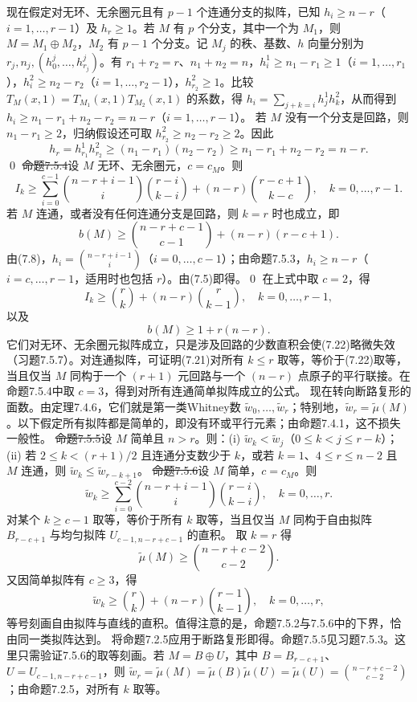 现在假定对无环、无余圈元且有 $p-1$ 个连通分支的拟阵，已知 $h_i\ge n-r$（$i=1,\ldots,r-1$）及 $h_r\ge1$。若 $M$ 有 $p$ 个分支，其中一个为 $M_1$，则 $M=M_1\oplus M_2$，$M_2$ 有 $p-1$ 个分支。记 $M_j$ 的秩、基数、$h$ 向量分别为 $r_j,n_j,(h_0^j,\ldots,h_{r_j}^j)$。有 $r_1+r_2=r$、$n_1+n_2=n$，$h_i^1\ge n_1-r_1\ge1$（$i=1,\ldots,r_1$），$h_i^2\ge n_2-r_2$（$i=1,\ldots,r_2-1$），$h_{r_2}^2\ge1$。比较 $T_M(x,1)=T_{M_1}(x,1)T_{M_2}(x,1)$ 的系数，得 $h_i=\sum_{j+k=i}h_j^1h_k^2$，从而得到 $h_i\ge n_1-r_1+n_2-r_2=n-r$（$i=1,\ldots,r-1$）。
若 $M$ 没有一个分支是回路，则 $n_1-r_1\ge2$，归纳假设还可取 $h_{r_2}^2\ge n_2-r_2\ge2$。因此
\[h_r=h_{r_1}^1h_{r_2}^2\ge(n_1-r_1)(n_2-r_2)\ge n_1-r_1+n_2-r_2=n-r.\]\qed
\st{命题7.5.4}设 $M$ 无环、无余圈元，$c=c_M$。则
\[I_k\ge\sum_{i=0}^{c-1}\binom{n-r+i-1}{i}\binom{r-i}{k-i}+(n-r)\binom{r-c+1}{k-c},\quad k=0,\ldots,r-1.\]
若 $M$ 连通，或者没有任何连通分支是回路，则 $k=r$ 时也成立，即
\[b(M)\ge\binom{n-r+c-1}{c-1}+(n-r)(r-c+1).\]
\pr 由(7.8)，$h_i=\binom{n-r+i-1}i$（$i=0,\ldots,c-1$）；由命题7.5.3，$h_i\ge n-r$（$i=c,\ldots,r-1$，适用时也包括 $r$）。由(7.5)即得。\qed
在上式中取 $c=2$，得
\[I_k\ge\binom rk+(n-r)\binom r{k-1},\quad k=0,\ldots,r-1,\tag{7.21}\]
以及
\[b(M)\ge1+r(n-r).\tag{7.22}\]
它们对无环、无余圈元拟阵成立，只是涉及回路的少数直积会使(7.22)略微失效（习题7.5.7）。对连通拟阵，可证明(7.21)对所有 $k\le r$ 取等，等价于(7.22)取等，当且仅当 $M$ 同构于一个 $(r+1)$ 元回路与一个 $(n-r)$ 点原子的平行联接。在命题7.5.4中取 $c=3$，得到对所有连通简单拟阵成立的公式。
现在转向断路复形的面数。由定理7.4.6，它们就是第一类Whitney数 $\widetilde w_0,\ldots,\widetilde w_r$；特别地，$\widetilde w_r=\widetilde\mu(M)$。以下假定所有拟阵都是简单的，即没有环或平行元素；由命题7.4.1，这不损失一般性。
\st{命题7.5.5}设 $M$ 简单且 $n>r$。则：(i) $\widetilde w_k<\widetilde w_j$（$0\le k<j\le r-k$）；(ii) 若 $2\le k<(r+1)/2$ 且连通分支数少于 $k$，或若 $k=1$、$4\le r\le n-2$ 且 $M$ 连通，则 $\widetilde w_k\le\widetilde w_{r-k+1}$。
\st{命题7.5.6}设 $M$ 简单，$c=c_M$。则
\[\widetilde w_k\ge\sum_{i=0}^{c-2}\binom{n-r+i-1}{i}\binom{r-i}{k-i},\quad k=0,\ldots,r.\]
对某个 $k\ge c-1$ 取等，等价于所有 $k$ 取等，当且仅当 $M$ 同构于自由拟阵 $B_{r-c+1}$ 与均匀拟阵 $U_{c-1,n-r+c-1}$ 的直积。
取 $k=r$ 得
\[\widetilde\mu(M)\ge\binom{n-r+c-2}{c-2}.\tag{7.23}\]
又因简单拟阵有 $c\ge3$，得
\[\widetilde w_k\ge\binom rk+(n-r)\binom{r-1}{k-1},\quad k=0,\ldots,r,\tag{7.24}\]
等号刻画自由拟阵与直线的直积。值得注意的是，命题7.5.2与7.5.6中的下界，恰由同一类拟阵达到。
\pr 将命题7.2.5应用于断路复形即得。命题7.5.5见习题7.5.3。这里只需验证7.5.6的取等刻画。若 $M=B\oplus U$，其中 $B=B_{r-c+1}$、$U=U_{c-1,n-r+c-1}$，则 $\widetilde w_r=\widetilde\mu(M)=\widetilde\mu(B)\widetilde\mu(U)=\widetilde\mu(U)=\binom{n-r+c-2}{c-2}$；由命题7.2.5，对所有 $k$ 取等。
